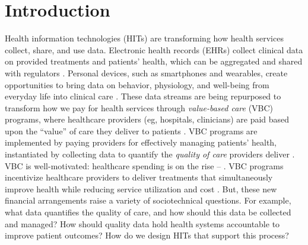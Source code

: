 \section{Introduction}
\label{sec:intro}

Health information technologies (HITs) are transforming how health services collect, share, and use data.
Electronic health records (EHRs) collect clinical data on provided treatments and patients' health, which can be aggregated and shared with regulators \cite{birkhead_uses_2015}.
Personal devices, such as smartphones and wearables, create opportunities to bring data on behavior, physiology, and well-being from everyday life into clinical care \cite{mohr_personal_2017, torous_new_2017}.
These data streams are being repurposed to transform how we pay for health services through \textit{value-based care} (VBC) programs, where healthcare providers (eg, hospitals, clinicians) are paid based upon the ``value'' of care they deliver to patients \cite{world_economic_forum_moment_2023, lewis_value-based_2023}.
VBC programs are implemented by paying providers for effectively managing patients' health, instantiated by collecting data to quantify the \textit{quality of care} providers deliver \cite{world_economic_forum_moment_2023, donabedian_quality_1988}. 
VBC is well-motivated: healthcare spending is on the rise -- .
VBC programs incentivize healthcare providers to deliver treatments that simultaneously improve health while reducing service utilization and cost \cite{mcclellan_improving_2017}. 
But, these new financial arrangements raise a variety of sociotechnical questions.
For example, what data quantifies the quality of care, and how should this data be collected and managed?
How should quality data hold health systems accountable to improve patient outcomes?
How do we design HITs that support this process?

